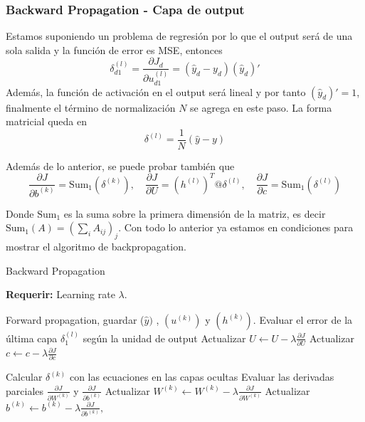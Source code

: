 \subsubsection{Backward Propagation - Capa de output}

Estamos suponiendo un problema de regresión por lo que el output será de una sola salida y la función de error es MSE, entonces 
\[
\delta_{d1}^{(l)} = \frac{\partial J_d}{\partial u_{d1}^{(l)}} = (\hat{y}_d-y_d) (\hat{y}_d)' 
\] 
Además, la función de activación en el output será lineal y por tanto $(\hat{y}_d)' = 1$, finalmente el término de normalización $N$ se agrega en este paso.  La forma matricial queda en 
\begin{equation}
\label{eq:capa_output}
\delta^{(l)} = \frac{1}{N}(\hat{y}-y) 
\end{equation}

Además de lo anterior, se puede probar también que 
\begin{equation}
	\frac{\partial J}{\partial b^{(k)}} = \text{Sum}_1 \left ( \delta^{(k)} \right ), \quad \frac{\partial J}{\partial U} = (h^{(l)})^T @ \delta^{(l)}, \quad \frac{\partial J}{\partial c} = \text{Sum}_1 \left ( \delta^{(l)}\right )
\end{equation}

Donde $\text{Sum}_1$ es la suma sobre la primera dimensión de la matriz, es decir  $\text{Sum}_1(A) = (\sum_{i}A_{ij})_j$. Con todo lo anterior ya estamos en condiciones para mostrar el algoritmo de backpropagation.

\begin{algorithm}[H]
	\caption{Backward Propagation} 
	\textbf{Requerir: } Learning rate $\lambda$.
	\begin{algorithmic}[1]
	\State Forward propagation, guardar  ($\hat{y})$ , $(u^{(k)})$ y $(h^{(k)})$.
	\State Evaluar el error de la última capa $\delta_1^{(l)}$  según la unidad de output
	\State  Actualizar $U \gets U - \lambda \frac{\partial J}{\partial U}$
	\State Actualizar $c \gets c - \lambda \frac{\partial J}{\partial c}$
		
		\State Calcular $\delta^{(k)}$ con las ecuaciones en las capas ocultas
		\State Evaluar las derivadas parciales $\frac{\partial J}{\partial W^{(k)}}$ y $\frac{\partial J}{\partial b^{(k)}}$
		\State Actualizar $W^{(k)} \gets W^{(k)} - \lambda \frac{\partial J}{\partial W^{(k)}}$
		\State Actualizar $b^{(k)} \gets b^{(k)} - \lambda \frac{\partial J}{\partial b^{(k)}}, \quad$
		
	\EndFor

	\end{algorithmic}
	
\end{algorithm}

